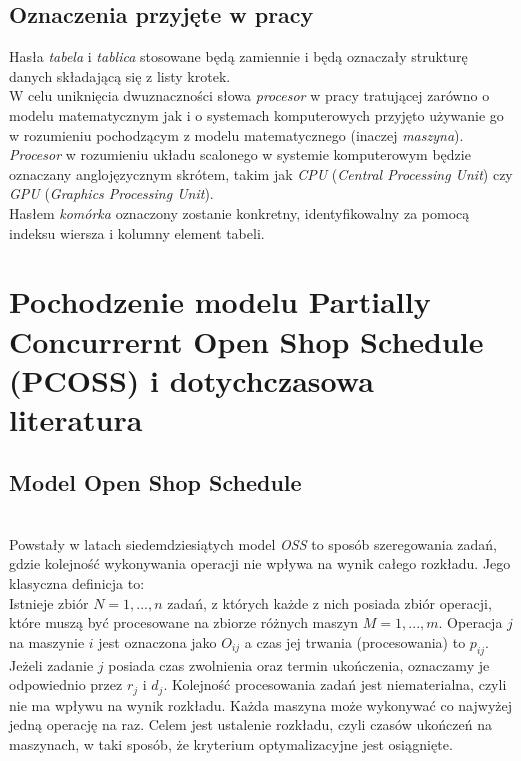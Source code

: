 \documentclass[brudnopis]{xmgr}
\begin{document}
\section{Oznaczenia przyjęte w pracy}

Hasła \emph{tabela} i \emph{tablica} stosowane będą zamiennie i będą oznaczały strukturę danych składającą się z listy krotek. 
\medskip\\

W celu uniknięcia dwuznaczności słowa \emph{procesor} w pracy tratującej zarówno o modelu matematycznym jak i o systemach komputerowych przyjęto używanie go w rozumieniu pochodzącym z modelu matematycznego (inaczej \emph{maszyna}).
\emph{Procesor} w rozumieniu układu scalonego w systemie komputerowym będzie oznaczany anglojęzycznym skrótem, takim jak \emph{CPU} (\emph{Central Processing Unit}) czy \emph{GPU} (\emph{Graphics Processing Unit}).
\medskip\\

Hasłem \emph{komórka} oznaczony zostanie konkretny, identyfikowalny za pomocą indeksu wiersza i kolumny element tabeli.

\chapter{Pochodzenie modelu Partially Concurrernt Open Shop Schedule (PCOSS) i dotychczasowa literatura}

\section{Model Open Shop Schedule}
\medskip\\
Powstały w latach siedemdziesiątych model \emph{OSS} to sposób szeregowania zadań, gdzie kolejność wykonywania operacji nie wpływa na wynik całego rozkładu. Jego klasyczna definicja to:
\medskip\\
{Istnieje zbiór $N={1,...,n}$ zadań, z których każde z nich posiada zbiór operacji, które muszą być procesowane na zbiorze różnych maszyn $M={1,...,m}$. Operacja $j$ na maszynie $i$ jest oznaczona jako $O_{ij}$ a czas jej trwania (procesowania) to $p_{ij}$. Jeżeli zadanie $j$ posiada czas zwolnienia oraz termin ukończenia, oznaczamy je odpowiednio przez $r_j$ i $d_j$. Kolejność procesowania zadań jest niematerialna, czyli nie ma wpływu na wynik rozkładu. Każda maszyna może wykonywać co najwyżej jedną operację na raz. Celem jest ustalenie rozkładu, czyli czasów ukończeń na maszynach, w taki sposób, że kryterium optymalizacyjne jest osiągnięte.}\cite{FourDecades:2020:X}
\medskip\\
\end{document}
